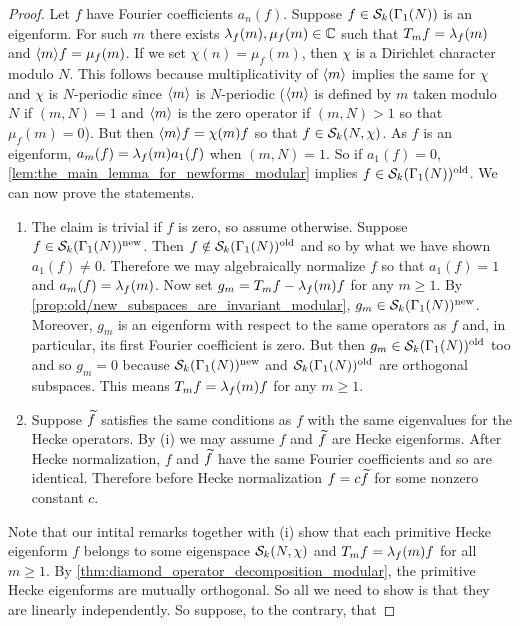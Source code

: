       \begin{proof}
        Let $f$ have Fourier coefficients $a_{n}(f)$. Suppose $f \in \mathcal{S}_{k}(\Gamma_{1}(N))$ is an eigenform. For such $m$ there exists $\lambda_{f}(m),\mu_{f}(m) \in \mathbb{C}$ such that $T_{m}f = \lambda_{f}(m)$ and $\langle m\rangle f = \mu_{f}(m)$. If we set $\chi(n) = \mu_{f}(m)$, then $\chi$ is a Dirichlet character modulo $N$. This follows because multiplicativity of $\langle m\rangle$ implies the same for $\chi$ and $\chi$ is $N$-periodic since $\langle m\rangle$ is $N$-periodic ($\langle m\rangle$ is defined by $m$ taken modulo $N$ if $(m,N) = 1$ and $\langle m\rangle$ is the zero operator if $(m,N) > 1$ so that $\mu_{f}(m) = 0$). But then $\langle m\rangle f = \chi(m)f$ so that $f \in \mathcal{S}_{k}(N,\chi)$. As $f$ is an eigenform, $a_{m}(f) = \lambda_{f}(m)a_{1}(f)$ when $(m,N) = 1$. So if $a_{1}(f) = 0$, \cref{lem:the_main_lemma_for_newforms_modular} implies $f \in \mathcal{S}_{k}(\Gamma_{1}(N))^{\mathrm{old}}$. We can now prove the statements.
        \begin{enumerate}[label=(\roman*)]
          \item The claim is trivial if $f$ is zero, so assume otherwise. Suppose $f \in \mathcal{S}_{k}(\Gamma_{1}(N))^{\mathrm{new}}$. Then $f \notin \mathcal{S}_{k}(\Gamma_{1}(N))^{\mathrm{old}}$ and so by what we have shown $a_{1}(f) \neq 0$. Therefore we may algebraically normalize $f$ so that $a_{1}(f) = 1$ and $a_{m}(f) = \lambda_{f}(m)$. Now set $g_{m} = T_{m}f-\lambda_{f}(m)f$ for any $m \ge 1$. By \cref{prop:old/new_subspaces_are_invariant_modular}, $g_{m} \in \mathcal{S}_{k}(\Gamma_{1}(N))^{\mathrm{new}}$. Moreover, $g_{m}$ is an eigenform with respect to the same operators as $f$ and, in particular, its first Fourier coefficient is zero. But then $g_{m} \in \mathcal{S}_{k}(\Gamma_{1}(N))^{\mathrm{old}}$ too and so $g_{m} = 0$ because $\mathcal{S}_{k}(\Gamma_{1}(N))^{\mathrm{new}}$ and $\mathcal{S}_{k}(\Gamma_{1}(N))^{\mathrm{old}}$ are orthogonal subspaces. This means $T_{m}f = \lambda_{f}(m)f$ for any $m \ge 1$.
          \item Suppose $\widetilde{f}$ satisfies the same conditions as $f$ with the same eigenvalues for the Hecke operators. By (i) we may assume $f$ and $\widetilde{f}$ are Hecke eigenforms. After Hecke normalization, $f$ and $\widetilde{f}$ have the same Fourier coefficients and so are identical. Therefore before Hecke normalization $f = c\widetilde{f}$ for some nonzero constant $c$.
        \end{enumerate}
        Note that our intital remarks together with (i) show that each primitive Hecke eigenform $f$ belongs to some eigenspace $\mathcal{S}_{k}(N,\chi)$ and $T_{m}f = \lambda_{f}(m)f$ for all $m \ge 1$. By \cref{thm:diamond_operator_decomposition_modular}, the primitive Hecke eigenforms are mutually orthogonal. So all we need to show is that they are linearly independently. So suppose, to the contrary, that

\end{proof}
